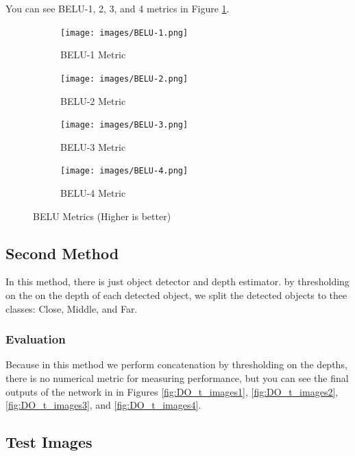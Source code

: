 \documentclass[a4paper, openany]{book}
\begin{document}
You can see BELU-1, 2, 3, and 4 metrics in Figure \ref{fig:BELU}.
\begin{figure}[ht]
  \centering
  
    \begin{subfigure}[b]{0.9\linewidth}
    \texttt{[image: images/BELU-1.png]}
    \caption{BELU-1 Metric}
  \end{subfigure}
  \begin{subfigure}[b]{0.9\linewidth}
    \texttt{[image: images/BELU-2.png]}
    \caption{BELU-2 Metric}
  \end{subfigure}
      \begin{subfigure}[b]{0.9\linewidth}
    \texttt{[image: images/BELU-3.png]}
    \caption{BELU-3 Metric}
  \end{subfigure}
  \begin{subfigure}[b]{0.9\linewidth}
    \texttt{[image: images/BELU-4.png]}
    \caption{BELU-4 Metric}
  \end{subfigure}
  
      \caption{BELU Metrics (Higher is better)}
  \label{fig:BELU}
\end{figure}


\subsection{Second Method}
	\vspace{0.3cm}

In this method, there is just object detector and depth estimator. by thresholding on the on the depth of each detected object, we split the detected objects to thee classes: Close, Middle, and Far.

\subsubsection{Evaluation}
	\vspace{0.3cm}

Because in this method we perform concatenation by thresholding on the depths, there is no numerical metric for measuring performance, but you can see the final outputs of the network in in Figures \ref{fig:DO_t_images1}, \ref{fig:DO_t_images2}, \ref{fig:DO_t_images3}, and \ref{fig:DO_t_images4}.


\newpage

\subsection{Test Images}
	\vspace{0.3cm}
	
\end{document}
